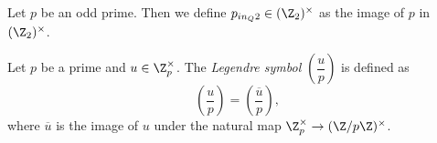 \begin{definition}
	\label{def:p2}
	\leanok
Let $p$ be an odd prime. Then we define $p_{in_Q2} \in (\Z_2)^\times$ as the image of $p$ in
$(\Z_2)^\times$.
\end{definition}

\begin{definition}\label{def:legendreSym'}
  \leanok
Let $p$ be a prime and $u \in \Z_p^\times$. The \emph{Legendre symbol} $\left(\dfrac{u}{p}\right)$
is defined as
\[\left(\dfrac{u}{p}\right)=\left(\dfrac{\overline{u}}{p}\right),\]
where $\overline{u}$ is the image of $u$ under the natural map $\Z_p^\times \to (\Z/p\Z)^\times$.
\end{definition}
